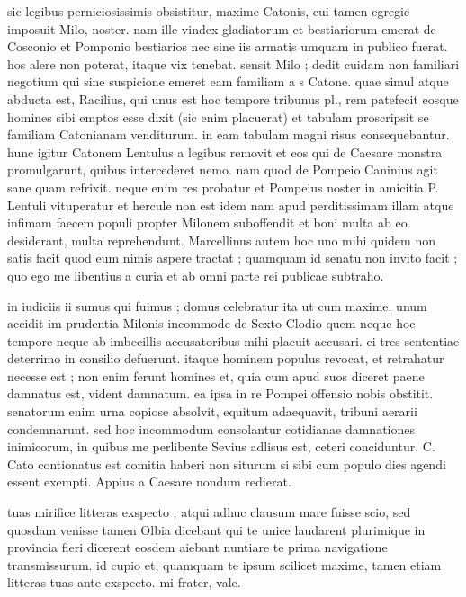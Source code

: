  sic legibus perniciosissimis obsistitur, maxime Catonis, cui tamen egregie imposuit Milo, noster. nam ille vindex gladiatorum et bestiariorum emerat de Cosconio et Pomponio bestiarios nec sine iis armatis umquam in publico fuerat. hos alere non poterat, itaque vix tenebat. sensit Milo ; dedit cuidam non familiari negotium qui sine suspicione emeret eam familiam a s Catone. quae simul atque abducta est, Racilius, qui unus est hoc tempore tribunus pl., rem patefecit eosque homines sibi emptos esse dixit (sic enim placuerat) et tabulam proscripsit se familiam Catonianam venditurum. in eam tabulam magni risus consequebantur. hunc igitur Catonem Lentulus a legibus removit et eos qui de Caesare monstra promulgarunt, quibus intercederet nemo. nam quod de Pompeio Caninius agit sane quam refrixit. neque enim res probatur et Pompeius noster in amicitia P. Lentuli vituperatur et hercule non est idem nam apud perditissimam illam atque infimam faecem populi propter Milonem suboffendit et boni multa ab eo desiderant, multa reprehendunt. Marcellinus autem hoc uno mihi quidem non satis facit quod eum nimis aspere tractat ; quamquam id senatu non invito facit ; quo ego me libentius a curia et ab omni parte rei publicae subtraho.

 in iudiciis ii sumus qui fuimus ; domus celebratur ita ut cum maxime. unum accidit im prudentia Milonis incommode de Sexto Clodio quem neque hoc tempore neque ab imbecillis accusatoribus mihi placuit accusari. ei tres sententiae deterrimo in consilio defuerunt. itaque hominem populus revocat, et retrahatur necesse est ; non enim ferunt homines et, quia cum apud suos diceret paene damnatus est, vident damnatum. ea ipsa in re Pompei offensio nobis obstitit. senatorum enim urna copiose absolvit, equitum adaequavit, tribuni aerarii condemnarunt. sed hoc incommodum consolantur cotidianae damnationes inimicorum, in quibus me perlibente Sevius adlisus est, ceteri conciduntur. C. Cato contionatus est comitia haberi non siturum si sibi cum populo dies agendi essent exempti. Appius a Caesare nondum redierat.

 tuas mirifice litteras exspecto ; atqui adhuc clausum mare fuisse scio, sed quosdam venisse tamen Olbia dicebant qui te unice laudarent plurimique in provincia fieri dicerent eosdem aiebant nuntiare te prima navigatione transmissurum. id cupio et, quamquam te ipsum scilicet maxime, tamen etiam litteras tuas ante exspecto. mi frater, vale.

